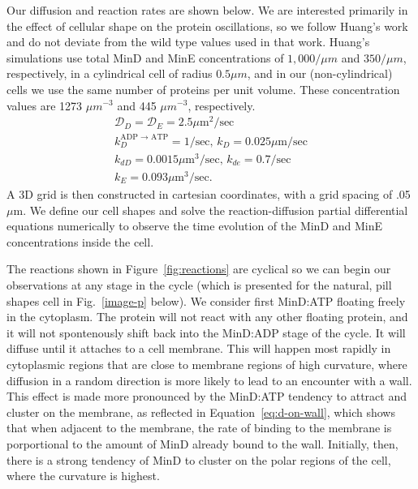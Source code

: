 \documentclass[letterpaper,twocolumn,amsmath,amssymb,pre]{revtex4-1}
\newcommand\micron{\ensuremath{\mu\text{m}}}
\begin{document}
Our diffusion and reaction rates are shown below.  We are interested
primarily in the effect of cellular shape on the protein
oscillations, so we follow Huang's work\cite{huang2003dynamic} and do
not deviate from the wild type values used in that work.  Huang's
simulations use total MinD and MinE concentrations of $1,000/\mu m$
and $350/\mu m$, respectively, in a cylindrical cell of radius $0.5\mu
m$, and in our (non-cylindrical) cells we use the same number of
proteins per unit volume.  These concentration values are 1273 $\mu
m^{-3}$ and 445 $\mu m^{-3}$, respectively.
\begin{gather*}
  \mathcal{D}_D = \mathcal{D}_{E} = 2.5\micron^2/\text{sec}\\
  k_D^{\textrm{ADP $\rightarrow$ ATP}} = 1/\textrm{sec,  }
  k_D = 0.025 \micron /\textrm{sec}\\
  k_{dD} = 0.0015 \micron^3/ \textrm{sec,  }
  k_{de} = 0.7/\textrm{sec}\\
  k_E = 0.093 \micron^3 /\textrm{sec}.
\end{gather*}
A 3D grid is then constructed in cartesian coordinates, with a grid
spacing of .05\micron. We define our cell shapes and solve the
reaction-diffusion partial differential equations numerically to
observe the time evolution of the MinD and MinE concentrations inside
the cell.

The reactions shown in Figure~\ref{fig:reactions} are cyclical so we
can begin our observations at any stage in the cycle (which is
presented for the natural, pill shapes cell in Fig.~\ref{image-p}
below).  We consider first MinD:ATP floating freely in the cytoplasm.
The protein will not react with any other floating protein, and it
will not spontenously shift back into the MinD:ADP stage of the cycle.
It will diffuse until it attaches to a cell membrane.  This will
happen most rapidly in cytoplasmic regions that are close to membrane
regions of high curvature, where diffusion in a random direction is
more likely to lead to an encounter with a wall.  This effect is made
more pronounced by the MinD:ATP tendency to attract and cluster on the
membrane, as reflected in Equation~\ref{eq:d-on-wall}, which shows
that when adjacent to the membrane, the rate of binding to the
membrane is porportional to the amount of MinD already bound to the
wall.  Initially, then, there is a strong tendency of MinD to cluster
on the polar regions of the cell, where the curvature is highest.
\end{document}
